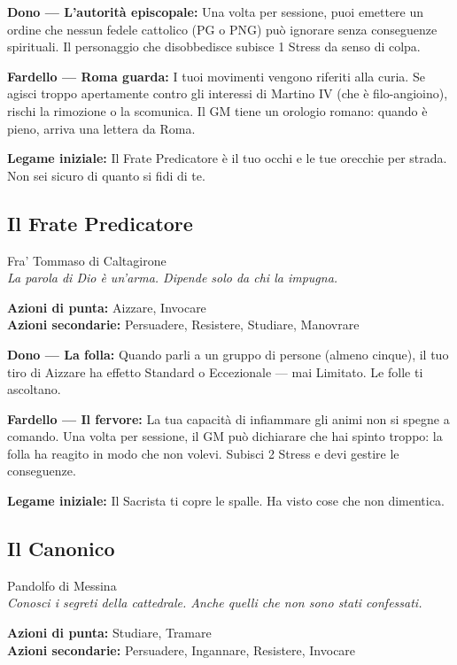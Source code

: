\textbf{Dono — L'autorità episcopale:} Una volta per sessione, puoi
emettere un ordine che nessun fedele cattolico (PG o PNG) può
ignorare senza conseguenze spirituali. Il personaggio che disobbedisce
subisce 1 Stress da senso di colpa.

\textbf{Fardello — Roma guarda:} I tuoi movimenti vengono riferiti
alla curia. Se agisci troppo apertamente contro gli interessi di
Martino IV (che è filo-angioino), rischi la rimozione o la scomunica.
Il GM tiene un orologio romano: quando è pieno, arriva una lettera
da Roma.

\textbf{Legame iniziale:} Il Frate Predicatore è il tuo occhi e le
tue orecchie per strada. Non sei sicuro di quanto si fidi di te.

\filetto

\subsection{Il Frate Predicatore}
{\cinzel\footnotesize\color{grigionote} Fra' Tommaso di Caltagirone}\\
\textit{La parola di Dio è un'arma. Dipende solo da chi la impugna.}

\textbf{Azioni di punta:} Aizzare, Invocare\\
\textbf{Azioni secondarie:} Persuadere, Resistere, Studiare, Manovrare

\textbf{Dono — La folla:} Quando parli a un gruppo di persone
(almeno cinque), il tuo tiro di Aizzare ha effetto Standard o
Eccezionale — mai Limitato. Le folle ti ascoltano.

\textbf{Fardello — Il fervore:} La tua capacità di infiammare gli
animi non si spegne a comando. Una volta per sessione, il GM può
dichiarare che hai spinto troppo: la folla ha reagito in modo che
non volevi. Subisci 2 Stress e devi gestire le conseguenze.

\textbf{Legame iniziale:} Il Sacrista ti copre le spalle. Ha visto
cose che non dimentica.

\filetto

\subsection{Il Canonico}
{\cinzel\footnotesize\color{grigionote} Pandolfo di Messina}\\
\textit{Conosci i segreti della cattedrale. Anche quelli che non
sono stati confessati.}

\textbf{Azioni di punta:} Studiare, Tramare\\
\textbf{Azioni secondarie:} Persuadere, Ingannare, Resistere, Invocare

